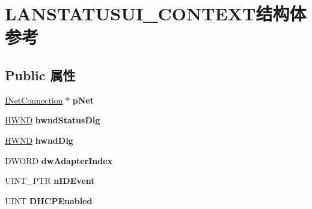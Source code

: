 \hypertarget{struct_l_a_n_s_t_a_t_u_s_u_i___c_o_n_t_e_x_t}{}\section{L\+A\+N\+S\+T\+A\+T\+U\+S\+U\+I\+\_\+\+C\+O\+N\+T\+E\+X\+T结构体 参考}
\label{struct_l_a_n_s_t_a_t_u_s_u_i___c_o_n_t_e_x_t}
\subsection*{Public 属性}
\begin{DoxyCompactItemize}
\item 
\mbox{\label{struct_l_a_n_s_t_a_t_u_s_u_i___c_o_n_t_e_x_t_ada1ecefa955572c9355123da7ba82557}} 
\hyperlink{interface_i_net_connection}{I\+Net\+Connection} $\ast$ {\bfseries p\+Net}
\item 
\mbox{\label{struct_l_a_n_s_t_a_t_u_s_u_i___c_o_n_t_e_x_t_ad8ac44d81fb461b27346baba7d4450c3}} 
\hyperlink{interfacevoid}{H\+W\+ND} {\bfseries hwnd\+Status\+Dlg}
\item 
\mbox{\label{struct_l_a_n_s_t_a_t_u_s_u_i___c_o_n_t_e_x_t_a7ce0b904c766c723017e27bfd7ac46ff}} 
\hyperlink{interfacevoid}{H\+W\+ND} {\bfseries hwnd\+Dlg}
\item 
\mbox{\label{struct_l_a_n_s_t_a_t_u_s_u_i___c_o_n_t_e_x_t_a3a5b0be005accce37630a9cfb095387d}} 
D\+W\+O\+RD {\bfseries dw\+Adapter\+Index}
\item 
\mbox{\label{struct_l_a_n_s_t_a_t_u_s_u_i___c_o_n_t_e_x_t_a1895ecd478c25b56c1495cc181e3d4e2}} 
U\+I\+N\+T\+\_\+\+P\+TR {\bfseries n\+I\+D\+Event}
\item 
\mbox{\label{struct_l_a_n_s_t_a_t_u_s_u_i___c_o_n_t_e_x_t_a3e43f1f0aa67a306127801443b214c80}} 
U\+I\+NT {\bfseries D\+H\+C\+P\+Enabled}
\item 
\mbox{\label{struct_l_a_n_s_t_a_t_u_s_u_i___c_o_n_t_e_x_t_a9368f21b88e51a7254a14e552690b8f6}} 

\end{DoxyCompactItemize}
